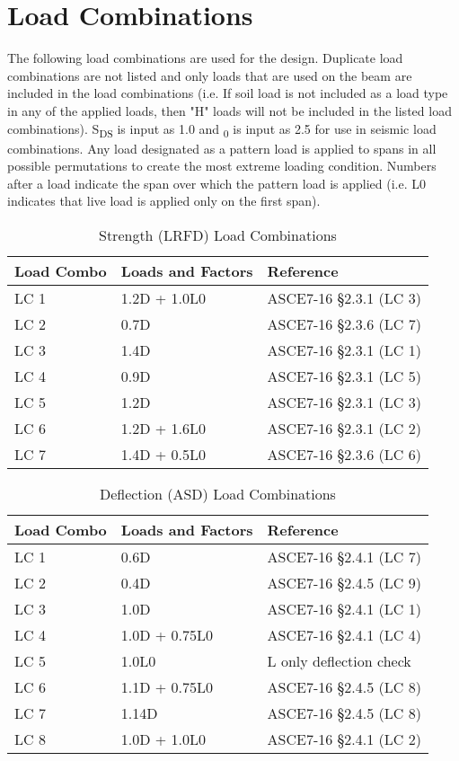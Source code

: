 \documentclass[12pt, fleqn]{article}
\begin{document}
\section{Load Combinations}
The following load combinations are used for the design. Duplicate load combinations are not listed and only loads that are used on the beam are included in the load combinations (i.e. If soil load is not included as a load type in any of the applied loads, then "H" loads will not be included in the listed load combinations). S\textsubscript{DS} is input as 1.0 and \textOmega\textsubscript{0} is input as 2.5 for use in seismic load combinations. Any load designated as a pattern load is applied to spans in all possible permutations to create the most extreme loading condition. Numbers after a load indicate the span over which the pattern load is applied (i.e. L0 indicates that live load is applied only on the first span).
\begin{table}[H]
\caption{Strength (LRFD) Load Combinations}
\centering
\begin{tabular}{l l l}
\hline
Load Combo & Loads and Factors & Reference\\
\hline
LC 1 & 1.2D + 1.0L0 & ASCE7-16 \S2.3.1 (LC 3)\\
LC 2 & 0.7D & ASCE7-16 \S2.3.6 (LC 7)\\
LC 3 & 1.4D & ASCE7-16 \S2.3.1 (LC 1)\\
LC 4 & 0.9D & ASCE7-16 \S2.3.1 (LC 5)\\
LC 5 & 1.2D & ASCE7-16 \S2.3.1 (LC 3)\\
LC 6 & 1.2D + 1.6L0 & ASCE7-16 \S2.3.1 (LC 2)\\
LC 7 & 1.4D + 0.5L0 & ASCE7-16 \S2.3.6 (LC 6)\\
\hline
\end{tabular}
\end{table}
\begin{table}[H]
\caption{Deflection (ASD) Load Combinations}
\centering
\begin{tabular}{l l l}
\hline
Load Combo & Loads and Factors & Reference\\
\hline
LC 1 & 0.6D & ASCE7-16 \S2.4.1 (LC 7)\\
LC 2 & 0.4D & ASCE7-16 \S2.4.5 (LC 9)\\
LC 3 & 1.0D & ASCE7-16 \S2.4.1 (LC 1)\\
LC 4 & 1.0D + 0.75L0 & ASCE7-16 \S2.4.1 (LC 4)\\
LC 5 & 1.0L0 & L only deflection check\\
LC 6 & 1.1D + 0.75L0 & ASCE7-16 \S2.4.5 (LC 8)\\
LC 7 & 1.14D & ASCE7-16 \S2.4.5 (LC 8)\\
LC 8 & 1.0D + 1.0L0 & ASCE7-16 \S2.4.1 (LC 2)\\
\hline
\end{tabular}
\end{table}
\end{document}
